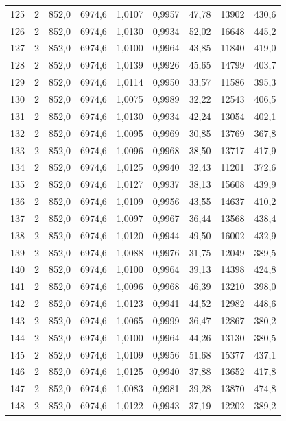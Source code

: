 \documentclass[11pt,a4paper]{article}
\begin{document}
{\begin{longtable}{r c r r r r r r r}
125 & 2 & 852,0 & 6974,6 & 1,0107 & 0,9957 & 47,78 & 13902 & 430,6 \\
126 & 2 & 852,0 & 6974,6 & 1,0130 & 0,9934 & 52,02 & 16648 & 445,2 \\
127 & 2 & 852,0 & 6974,6 & 1,0100 & 0,9964 & 43,85 & 11840 & 419,0 \\
128 & 2 & 852,0 & 6974,6 & 1,0139 & 0,9926 & 45,65 & 14799 & 403,7 \\
129 & 2 & 852,0 & 6974,6 & 1,0114 & 0,9950 & 33,57 & 11586 & 395,3 \\
130 & 2 & 852,0 & 6974,6 & 1,0075 & 0,9989 & 32,22 & 12543 & 406,5 \\
131 & 2 & 852,0 & 6974,6 & 1,0130 & 0,9934 & 42,24 & 13054 & 402,1 \\
132 & 2 & 852,0 & 6974,6 & 1,0095 & 0,9969 & 30,85 & 13769 & 367,8 \\
133 & 2 & 852,0 & 6974,6 & 1,0096 & 0,9968 & 38,50 & 13717 & 417,9 \\
134 & 2 & 852,0 & 6974,6 & 1,0125 & 0,9940 & 32,43 & 11201 & 372,6 \\
135 & 2 & 852,0 & 6974,6 & 1,0127 & 0,9937 & 38,13 & 15608 & 439,9 \\
136 & 2 & 852,0 & 6974,6 & 1,0109 & 0,9956 & 43,55 & 14637 & 410,2 \\
137 & 2 & 852,0 & 6974,6 & 1,0097 & 0,9967 & 36,44 & 13568 & 438,4 \\
138 & 2 & 852,0 & 6974,6 & 1,0120 & 0,9944 & 49,50 & 16002 & 432,9 \\
139 & 2 & 852,0 & 6974,6 & 1,0088 & 0,9976 & 31,75 & 12049 & 389,5 \\
140 & 2 & 852,0 & 6974,6 & 1,0100 & 0,9964 & 39,13 & 14398 & 424,8 \\
141 & 2 & 852,0 & 6974,6 & 1,0096 & 0,9968 & 46,39 & 13210 & 398,0 \\
142 & 2 & 852,0 & 6974,6 & 1,0123 & 0,9941 & 44,52 & 12982 & 448,6 \\
143 & 2 & 852,0 & 6974,6 & 1,0065 & 0,9999 & 36,47 & 12867 & 380,2 \\
144 & 2 & 852,0 & 6974,6 & 1,0100 & 0,9964 & 44,26 & 13130 & 380,5 \\
145 & 2 & 852,0 & 6974,6 & 1,0109 & 0,9956 & 51,68 & 15377 & 437,1 \\
146 & 2 & 852,0 & 6974,6 & 1,0125 & 0,9940 & 37,88 & 13652 & 417,8 \\
147 & 2 & 852,0 & 6974,6 & 1,0083 & 0,9981 & 39,28 & 13870 & 474,8 \\
148 & 2 & 852,0 & 6974,6 & 1,0122 & 0,9943 & 37,19 & 12202 & 389,2 \\

\end{longtable}}
\end{document}

